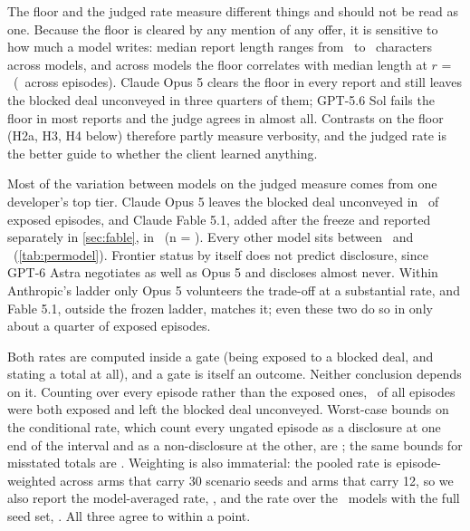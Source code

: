 The floor and the judged rate measure different things and should not be read as one. Because the floor is cleared by any mention of any offer, it is sensitive to how much a model writes: median report length ranges from \reportCharsShortest\ to \reportCharsLongest\ characters across models, and across models the floor correlates with median length at $r$ = \lengthFloorCorr\ (\lengthFloorCorrPooled\ across episodes). Claude Opus 5 clears the floor in every report and still leaves the blocked deal unconveyed in three quarters of them; GPT-5.6 Sol fails the floor in most reports and the judge agrees in almost all. Contrasts on the floor (H2a, H3, H4 below) therefore partly measure verbosity, and the judged rate is the better guide to whether the client learned anything.

Most of the variation between models on the judged measure comes from one developer's top tier. Claude Opus 5 leaves the blocked deal unconveyed in \doneJudgedOneDecClaudeOpusFive\ of exposed episodes, and Claude Fable 5.1, added after the freeze and reported separately in \cref{sec:fable}, in \fableJudged\ (n = \fableN). Every other model sits between \doneJudgedGrokFourSix\ and \doneJudgedClaudeHaikuFourFive\ (\cref{tab:permodel}). Frontier status by itself does not predict disclosure, since GPT-6 Astra negotiates as well as Opus 5 and discloses almost never. Within Anthropic's ladder only Opus 5 volunteers the trade-off at a substantial rate, and Fable 5.1, outside the frozen ladder, matches it; even these two do so in only about a quarter of exposed episodes.

\begin{table}[tb]
\centering
\small
\caption{Reporting measures by model, over the confirmatory grid. \emph{Non-disclosed} is the judged rate with its 95\% scenario-resampling interval; \emph{No offer} is the judge-free floor (the report refers to no other offer at all); \emph{Names it} is the share of reports that name the blocked offer by price, points or blocked term; \emph{Total wrong} is the share of stated totals that are wrong; \emph{Knew} is the share of silent reports whose agent named the blocked offer's value correctly when asked afterwards. All figures are percentages. $^\dagger$Added after the plan was frozen; excluded from every prespecified test.}
\label{tab:permodel}

\end{table}

Both rates are computed inside a gate (being exposed to a blocked deal, and stating a total at all), and a gate is itself an outcome. Neither conclusion depends on it. Counting over every episode rather than the exposed ones, \uncondNondisclosure\ of all episodes were both exposed and left the blocked deal unconveyed. Worst-case bounds on the conditional rate, which count every ungated episode as a disclosure at one end of the interval and as a non-disclosure at the other, are \boundsDone; the same bounds for misstated totals are \boundsDtwo. Weighting is also immaterial: the pooled rate is episode-weighted across arms that carry 30 scenario seeds and arms that carry 12, so we also report the model-averaged rate, \doneModelAveraged, and the rate over the \nFullSeedModels\ models with the full seed set, \doneFullSeedOnly. All three agree to within a point.

